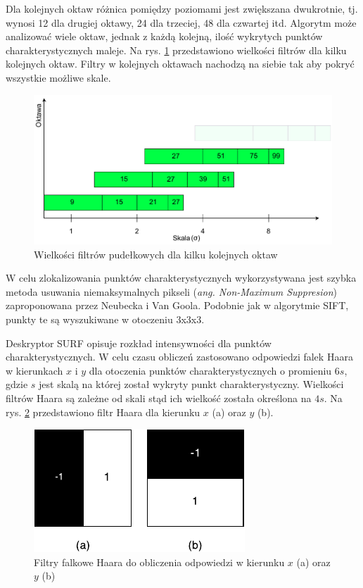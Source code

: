 Dla kolejnych oktaw różnica pomiędzy poziomami jest zwiększana dwukrotnie, tj. wynosi 12 dla drugiej oktawy, 24 dla trzeciej, 48 dla czwartej itd. Algorytm może analizować wiele oktaw, jednak z każdą kolejną, ilość wykrytych punktów charakterystycznych maleje. Na rys. \ref{fig:surf-octaves} przedstawiono wielkości filtrów dla kilku kolejnych oktaw. Filtry w kolejnych oktawach nachodzą na siebie tak aby pokryć wszystkie możliwe skale.

\begin{figure}[h]
	\centering
	\includegraphics[scale=0.7]{graphics/01_podstawy_teoretyczne/surf-octaves.pdf}
	\caption{Wielkości filtrów pudełkowych dla kilku kolejnych oktaw \cite{BAY08}}
	\label{fig:surf-octaves}
\end{figure}

W celu zlokalizowania punktów charakterystycznych wykorzystywana jest szybka metoda usuwania niemaksymalnych pikseli (\emph{ang. Non-Maximum Suppresion}) zaproponowana przez Neubecka i Van Goola\cite{NEUBECK06}. Podobnie jak w algorytmie SIFT, punkty te są wyszukiwane w otoczeniu 3x3x3.

Deskryptor SURF opisuje rozkład intensywności dla punktów charakterystycznych. W celu czasu obliczeń zastosowano odpowiedzi falek Haara w kierunkach $x$ i $y$ dla otoczenia punktów charakterystycznych o promieniu $6s$, gdzie $s$ jest skalą na której został wykryty punkt charakterystyczny. Wielkości filtrów Haara są zależne od skali stąd ich wielkość została określona na $4s$. Na rys. \ref{fig:surf-haar-wavelet} przedstawiono filtr Haara dla kierunku $x$ (a) oraz $y$ (b).

\begin{figure}[h]
	\centering
	\includegraphics[scale=1.5]{graphics/01_podstawy_teoretyczne/surf-haar-wavelet.pdf}
	\caption{Filtry falkowe Haara do obliczenia odpowiedzi w kierunku $x$ (a) oraz $y$ (b) \cite{BAY08}}
	\label{fig:surf-haar-wavelet}
\end{figure}


